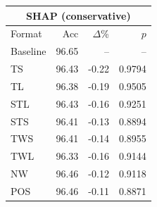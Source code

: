 \begin{tabular}{lrrr}
\toprule
\multicolumn{4}{c}{\textbf{SHAP (conservative)}} \\
\midrule
Format & Acc & $\Delta$\% & $p$ \\
\midrule
Baseline & 96.65 & -- & -- \\
\midrule
TS & 96.43 & -0.22 & 0.9794 \\
TL & 96.38 & -0.19 & 0.9505 \\
STL & 96.43 & -0.16 & 0.9251 \\
STS & 96.41 & -0.13 & 0.8894 \\
TWS & 96.41 & -0.14 & 0.8955 \\
TWL & 96.33 & -0.16 & 0.9144 \\
NW & 96.46 & -0.12 & 0.9118 \\
POS & 96.46 & -0.11 & 0.8871 \\
\bottomrule
\end{tabular}